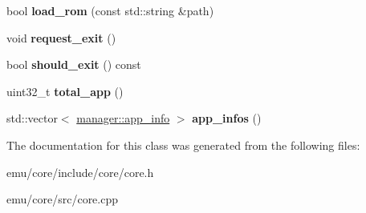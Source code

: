 \begin{DoxyCompactItemize}
bool {\bfseries load\+\_\+rom} (const std\+::string \&path)
\item 
\mbox{\label{classeka2l1_1_1system_a7faf059f54f8fa82a9ea9fae7a65f528}} 
void {\bfseries request\+\_\+exit} ()
\item 
\mbox{\label{classeka2l1_1_1system_a0d7ef89a0cbb92918273d01ec89fa32d}} 
bool {\bfseries should\+\_\+exit} () const
\item 
\mbox{\label{classeka2l1_1_1system_a11ae7d6ed1cd2a83337c475e599e2623}} 
uint32\+\_\+t {\bfseries total\+\_\+app} ()
\item 
\mbox{\label{classeka2l1_1_1system_ada4b6bbf5bee3fd2c6cf1084c5a5e70c}} 
std\+::vector$<$ \mbox{\hyperlink{structeka2l1_1_1manager_1_1app__info}{manager\+::app\+\_\+info}} $>$ {\bfseries app\+\_\+infos} ()
\end{DoxyCompactItemize}


The documentation for this class was generated from the following files\+:\begin{DoxyCompactItemize}
\item 
emu/core/include/core/core.\+h\item 
emu/core/src/core.\+cpp\end{DoxyCompactItemize}
